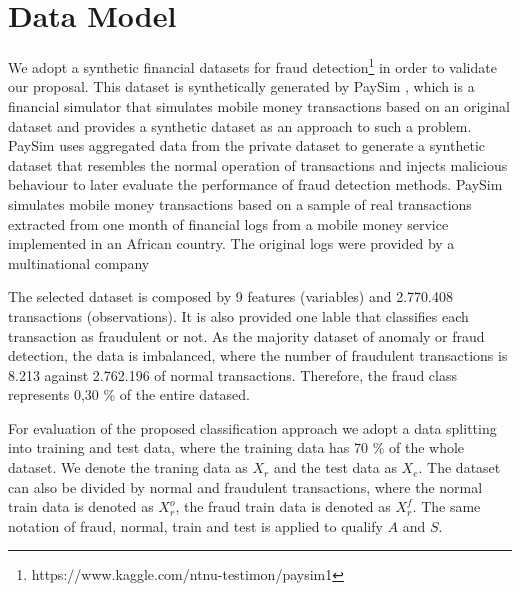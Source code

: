 \section{Data Model}
\label{sec:4_datamodel}


We adopt a synthetic financial datasets for fraud detection\footnote{https://www.kaggle.com/ntnu-testimon/paysim1} in order to validate our proposal. This dataset is synthetically generated by  PaySim \cite{lopez2016paysim}, which is a financial simulator that simulates mobile money transactions based on an original dataset and provides a synthetic dataset as an approach to such a problem. PaySim uses aggregated data from the private dataset to generate a synthetic dataset that resembles the normal operation of transactions and injects malicious behaviour to later evaluate the performance of fraud detection methods. PaySim simulates mobile money transactions based on a sample of real transactions extracted from one month of financial logs from a mobile money service implemented in an African country. The original logs were provided by a multinational company

The selected dataset is composed by 9 features (variables) and 2.770.408 transactions (observations). It is also provided one lable that classifies each transaction as fraudulent or not. As the majority dataset of anomaly or fraud detection, the data is imbalanced, where the number of fraudulent transactions is 8.213 against 2.762.196 of normal transactions. Therefore, the fraud class represents 0,30 \% of the entire datased. 

For evaluation of the proposed classification approach we adopt a data splitting into training and test data, where the training data has 70 \% of the whole dataset. We denote the traning data as $X_r$ and the test data as $X_e$. The dataset can also be divided by normal and fraudulent transactions, where the normal train data is denoted as $X_r^o$, the fraud train data is denoted as $X_r^f$. The same notation of fraud, normal, train and test is applied to qualify $A$ and $S$.


